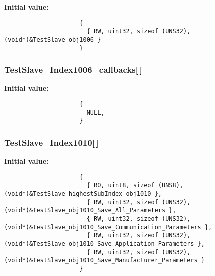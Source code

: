 \textbf{Initial value:}

\begin{Code}\begin{verbatim} 
                     {
                       { RW, uint32, sizeof (UNS32), (void*)&TestSlave_obj1006 }
                     }
\end{verbatim}\end{Code}
\subsubsection{ {\bf Test\-Slave\_\-Index1006\_\-callbacks}[$\,$]}\label{TestSlave_8c_388a6781923a021dc9b0ce8762024c9a}


\textbf{Initial value:}

\begin{Code}\begin{verbatim} 
                     {
                       NULL,
                     }
\end{verbatim}\end{Code}
\subsubsection{ {\bf Test\-Slave\_\-Index1010}[$\,$]}\label{TestSlave_8c_1b3142d7c2ee614a0bbdae3be2adb17c}


\textbf{Initial value:}

\begin{Code}\begin{verbatim} 
                     {
                       { RO, uint8, sizeof (UNS8), (void*)&TestSlave_highestSubIndex_obj1010 },
                       { RW, uint32, sizeof (UNS32), (void*)&TestSlave_obj1010_Save_All_Parameters },
                       { RW, uint32, sizeof (UNS32), (void*)&TestSlave_obj1010_Save_Communication_Parameters },
                       { RW, uint32, sizeof (UNS32), (void*)&TestSlave_obj1010_Save_Application_Parameters },
                       { RW, uint32, sizeof (UNS32), (void*)&TestSlave_obj1010_Save_Manufacturer_Parameters }
                     }
\end{verbatim}\end{Code}
